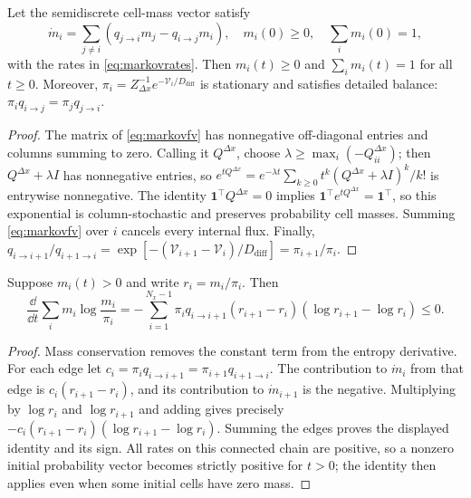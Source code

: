 \documentclass[12pt,a4paper,oneside]{book}
\begin{document}
\begin{theorem}
\label{thm:markovfv}
\label{src:p8main}
Let the semidiscrete cell-mass vector satisfy
\begin{equation}
 \dot m_i=\sum_{j\neq i}(q_{j\to i}m_j-q_{i\to j}m_i),
 \quad m_i(0)\geq0,\quad\sum_i m_i(0)=1,
\label{eq:markovfv}
\end{equation}
with the rates in \eqref{eq:markovrates}. Then
$m_i(t)\geq0$ and $\sum_i m_i(t)=1$ for all $t\geq0$.
Moreover, $\pi_i=Z_{\Delta x}^{-1}e^{-\mathcal V_i/{D_{\mathrm{diff}}}}$ is stationary and satisfies
detailed balance: $\pi_i q_{i\to j}=\pi_jq_{j\to i}$.
\end{theorem}
\begin{proof}
The matrix of \eqref{eq:markovfv} has nonnegative off-diagonal
entries and columns summing to zero. Calling it $Q^{\Delta x}$, choose
$\lambda\ge\max_i(-Q^{\Delta x}_{ii})$; then $Q^{\Delta x}+\lambda I$ has nonnegative
entries, so
$e^{tQ^{\Delta x}}=e^{-\lambda t}\sum_{k\ge0}t^k(Q^{\Delta x}+\lambda I)^k/k!$
is entrywise nonnegative. The identity $\mathbf1^\top Q^{\Delta x}=0$
implies $\mathbf1^\top e^{tQ^{\Delta x}}=\mathbf1^\top$, so this exponential
is column-stochastic and preserves probability cell masses. Summing \eqref{eq:markovfv}
over $i$ cancels every internal flux. Finally,
$q_{i\to i+1}/q_{i+1\to i}
=\exp[-(\mathcal V_{i+1}-\mathcal V_i)/{D_{\mathrm{diff}}}]=\pi_{i+1}/\pi_i$.
\end{proof}

\begin{proposition}
Suppose $m_i(t)>0$ and write $r_i=m_i/\pi_i$. Then
\begin{equation}
 \frac{\dd}{\dd t}\sum_i m_i\log\frac{m_i}{\pi_i}
 =-\sum_{i=1}^{N_x-1}\pi_i q_{i\to i+1}
 (r_{i+1}-r_i)(\log r_{i+1}-\log r_i)\leq0.
\label{eq:discreteent}
\end{equation}
\end{proposition}
\begin{proof}
Mass conservation removes the constant term from the entropy derivative.
For each edge let $c_i=\pi_i q_{i\to i+1}=\pi_{i+1}q_{i+1\to i}$.
The contribution to $\dot m_i$ from that edge is
$c_i(r_{i+1}-r_i)$, and its contribution to $\dot m_{i+1}$ is
the negative. Multiplying by $\log r_i$ and $\log r_{i+1}$ and
adding gives precisely
$-c_i(r_{i+1}-r_i)(\log r_{i+1}-\log r_i)$.
Summing the edges proves the displayed identity and its sign.
All rates on this connected chain are positive, so a nonzero initial
probability vector becomes strictly positive for $t>0$; the identity
then applies even when some initial cells have zero mass.
\end{proof}
\end{document}
